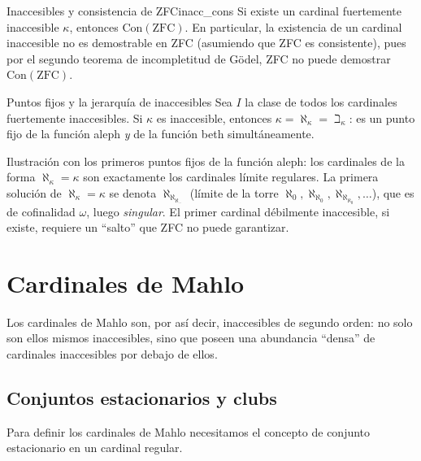 \begin{corolario}{Inaccesibles y consistencia de ZFC}{inacc_cons}
Si existe un cardinal fuertemente inaccesible $\kappa$, entonces $\mathrm{Con}(\mathrm{ZFC})$. En particular, la existencia de un cardinal inaccesible no es demostrable en ZFC (asumiendo que ZFC es consistente), pues por el segundo teorema de incompletitud de Gödel, ZFC no puede demostrar $\mathrm{Con}(\mathrm{ZFC})$.
\end{corolario}

\begin{ejemplo}{Puntos fijos y la jerarquía de inaccesibles}{}
Sea $I$ la clase de todos los cardinales fuertemente inaccesibles. Si $\kappa$ es inaccesible, entonces $\kappa = \aleph_\kappa = \beth_\kappa$: es un punto fijo de la función aleph \emph{y} de la función beth simultáneamente. 

Ilustración con los primeros puntos fijos de la función aleph: los cardinales de la forma $\aleph_\kappa = \kappa$ son exactamente los cardinales límite regulares. La primera solución de $\aleph_\kappa = \kappa$ se denota $\aleph_{\aleph_{\aleph_{\cdots}}}$ (límite de la torre $\aleph_0, \aleph_{\aleph_0}, \aleph_{\aleph_{\aleph_0}}, \ldots$), que es de cofinalidad $\omega$, luego \emph{singular}. El primer cardinal débilmente inaccesible, si existe, requiere un ``salto'' que ZFC no puede garantizar.
\end{ejemplo}

\section{Cardinales de Mahlo}

Los cardinales de Mahlo son, por así decir, inaccesibles de segundo orden: no solo son ellos mismos inaccesibles, sino que poseen una abundancia ``densa'' de cardinales inaccesibles por debajo de ellos.

\subsection{Conjuntos estacionarios y clubs}

Para definir los cardinales de Mahlo necesitamos el concepto de conjunto estacionario en un cardinal regular.

